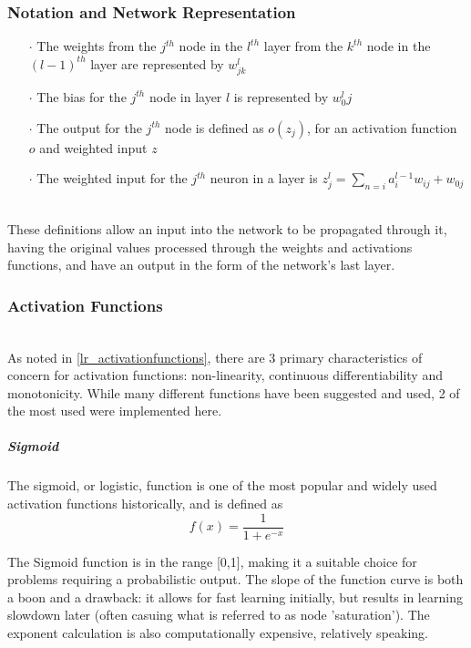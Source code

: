 \documentclass[a4paper,latin]{paper}
\begin{document}
\subsubsection{Notation and Network Representation}\label{imp_ffn_functions}

\begin{itemize}
\item[$\cdot$] The weights from the $j^{th}$ node in the $l^{th}$ layer from the $k^{th}$ node in the $(l-1)^{th}$ layer are represented by $w^l_{jk}$
\item[$\cdot$] The bias for the $j^{th}$ node in layer $l$ is represented by $w^l_0j$
\item[$\cdot$] The output for the $j^{th}$ node is defined as $o(z_j)$, for an activation function $o$ and weighted input $z$
\item[$\cdot$] The weighted input for the $j^{th}$ neuron in a layer is $z^l_j=\sum_{n=i}{a^{l-1}_iw_{ij}} + w_{0j}$
\end{itemize}
~\\
These definitions allow an input into the network to be propagated through it, having the original values processed through the weights and activations functions, and have an output in the form of the network's last layer.

\subsubsection{Activation Functions}\label{imp_activation_functions}
~\\
As noted in \ref{lr_activationfunctions}, there are 3 primary characteristics of concern for activation functions: non-linearity, continuous differentiability and monotonicity. While many different functions have been suggested and used, 2 of the most used were implemented here.

\subparagraph{Sigmoid}

The sigmoid, or logistic, function is one of the most popular and widely used activation functions historically, and is defined as 
\begin{equation}\label{func_sigmoid}
f(x) = \frac{1}{1 + e^{-x}}
\end{equation}

The Sigmoid function is in the range [0,1], making it a suitable choice for problems requiring a probabilistic output. The slope of the function curve is both a boon and a drawback: it allows for fast learning initially, but results in learning slowdown later (often casuing what is referred to as node 'saturation'). The exponent calculation is also computationally expensive, relatively speaking.
\end{document}
